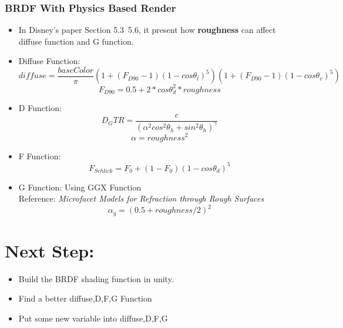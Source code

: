 \documentclass[cyan,normal,en]{elegantnote}
\begin{document}
\subsubsection{BRDF With Physics Based Render}
\begin{itemize}
	\item In Disney's paper Section 5.3~5.6, it present how \textbf{roughness} can affect diffuse function and G function.
	\item Diffuse Function:
	$$diffuse=\frac{baseColor}{\pi}(1+(F_{D90}-1)(1-cos\theta_l)^5)(1+(F_{D90}-1)(1-cos\theta_v)^5)$$
	$$F_{D90}=0.5+2*cos\theta^2_d*roughness$$
	\item D Function:
	$$D_GTR=\frac{c}{(\alpha^2cos^2\theta_h +sin^2\theta_h)^\gamma}$$
	$$\alpha=roughness^2$$
	\item F Function:
	$$F_{Schlick}=F_0 + (1-F_0)(1-cos\theta_d)^5$$
	\item G Function: Using GGX Function\\
	Reference: \textit{Microfacet Models for Refraction through Rough Surfaces }
	$$\alpha_g=(0.5+roughness/2)^2$$
\end{itemize}
\section{Next Step:}
\begin{itemize}
	\item Build the BRDF shading function in unity.
	\item Find a better diffuse,D,F,G Function
	\item Put some new variable into diffuse,D,F,G
\end{itemize}
\end{document}
